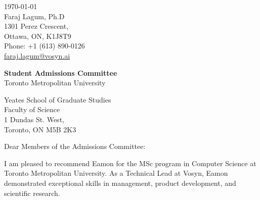 \documentclass[letterpaper,11pt,oneside]{article}
\newcommand{\ignore}[1]{}
\begin{document}
\ignore
{

}

\clearpage
\setlength\parindent{0cm}




\def\youruniversity{Toronto Metropolitan University}

\def\yourfiled{Artificial Intelligence and Machine Learning Program}
\def\collageaddress{Yeates School of Graduate Studies                 \\
Faculty of Science \\
1 Dundas St. West,  \\
Toronto, ON	M5B 2K3
}


\def\lambtoncollageaddress{Department of International Education \\
110 Hazel St., \\
Ottawa, ON K1S 1C5}

\begin{flushright}
 \today                           \\
 \vspace{1em}                              
 Faraj Lagum, Ph.D            \\
 1301 Perez Crescent,                       \\
 Ottawa, ON, K1J8T9   \\
 Phone: +1 (613) 890-0126        \\
\href{mailto:faraj.lagum@carleton.ca}{faraj.lagum@vosyn.ai}  \\ %
\end{flushright}


\begin{flushleft}
 \textbf{Student Admissions Committee}         \\
 \youruniversity 
 
 
\collageaddress
\end{flushleft}

\vspace{2em}

Dear Members of the Admissions Committee: \\
\vspace{0.5em}
\onehalfspacing

I am pleased to recommend Eamon for the MSc program in Computer Science at Toronto Metropolitan University. As a Technical Lead at Vosyn, Eamon demonstrated exceptional skills in management, product development, and scientific research.
\end{document}
